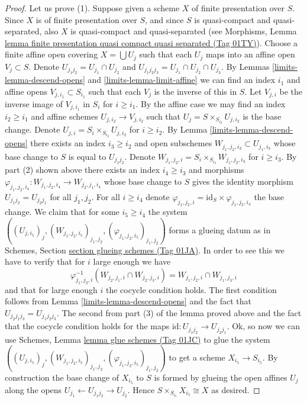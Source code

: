 \documentclass{amsart}
\theoremstyle{plain}
\theoremstyle{definition}
\theoremstyle{remark}
\numberwithin{equation}{subsection}
\begin{document}
\begin{proof}
\medskip\noindent
Let us prove (1). Suppose given a scheme $X$ of finite presentation
over $S$. Since $X$ is of finite presentation
over $S$, and since $S$ is quasi-compact and quasi-separated, also
$X$ is quasi-compact and quasi-separated
(see Morphisms,
Lemma \href{https://stacks.math.columbia.edu/tag/01TY}{lemma finite presentation quasi compact quasi separated (Tag 01TY)}).
Choose a finite affine open covering $X = \bigcup U_j$
such that each $U_j$ maps into an affine open $V_j \subset S$.
Denote $U_{j_1j_2} = U_{j_1} \cap U_{j_2}$ and
$U_{j_1j_2j_3} = U_{j_1} \cap U_{j_2} \cap U_{j_3}$.
By Lemmas \ref{limits-lemma-descend-opens} and \ref{limits-lemma-limit-affine}
we can find an index $i_1$ and affine opens $V_{j, i_1} \subset S_{i_1}$
such that each $V_j$ is the inverse of this in $S$.
Let $V_{j, i}$ be the inverse image of $V_{j, i_1}$ in $S_i$ for
$i \geq i_1$. By the affine case we may find an index $i_2 \geq i_1$ and
affine schemes $U_{j, i_2} \to V_{j, i_2}$ such
that $U_j = S \times_{S_{i_2}} U_{j, i_2}$ is the base change.
Denote $U_{j, i} = S_i \times_{S_{i_2}} U_{j, i_2}$ for $i \geq i_2$.
By Lemma \ref{limits-lemma-descend-opens} there exists an index
$i_3 \geq i_2$ and open subschemes
$W_{j_1, j_2, i_3} \subset U_{j_1, i_3}$
whose base change to $S$ is equal to $U_{j_1j_2}$.
Denote $W_{j_1, j_2, i} = S_i \times_{S_{i_3}} W_{j_1, j_2, i_3}$
for $i \geq i_3$. By part (2) shown above there exists an index
$i_4 \geq i_3$ and morphisms
$\varphi_{j_1, j_2, i_4} : W_{j_1, j_2, i_4} \to W_{j_2, j_1, i_4}$
whose base change to $S$ gives the identity morphism
$U_{j_1j_2} = U_{j_2j_1}$ for all $j_1, j_2$.
For all $i \geq i_4$ denote
$\varphi_{j_1, j_2, i} = \text{id}_S \times \varphi_{j_1, j_2, i_4}$
the base change. We claim that for some $i_5 \geq i_4$ the system
$((U_{j, i_5})_j, (W_{j_1, j_2, i_5})_{j_1, j_2},
(\varphi_{j_1, j_2, i_5})_{j_1, j_2})$ forms a glueing datum
as in Schemes, Section \href{https://stacks.math.columbia.edu/tag/01JA}{section glueing schemes (Tag 01JA)}.
In order to see this we have to verify that for $i$ large enough
we have
$$
\varphi_{j_1, j_2, i}^{-1}(W_{j_2, j_1, i} \cap W_{j_2, j_3, i})
=
W_{j_1, j_2, i} \cap W_{j_1, j_3, i}
$$
and that for large enough $i$ the cocycle condition holds.
The first condition follows from Lemma \ref{limits-lemma-descend-opens}
and the fact that $U_{j_2j_1j_3} = U_{j_1j_2j_3}$.
The second from part (3) of the lemma proved above and the fact
that the cocycle condition holds for the maps
$\text{id} : U_{j_1j_2} \to U_{j_2j_1}$.
Ok, so now we can use Schemes, Lemma \href{https://stacks.math.columbia.edu/tag/01JC}{lemma glue schemes (Tag 01JC)}
to glue the system
$((U_{j, i_5})_j, (W_{j_1, j_2, i_5})_{j_1, j_2},
(\varphi_{j_1, j_2, i_5})_{j_1, j_2})$ to get a scheme
$X_{i_5} \to S_{i_5}$. By construction the base change of
$X_{i_5}$ to $S$ is formed by glueing the open affines
$U_j$ along the opens $U_{j_1} \leftarrow U_{j_1j_2} \rightarrow U_{j_2}$.
Hence $S \times_{S_{i_5}} X_{i_5} \cong X$ as desired.
\end{proof}
\end{document}
